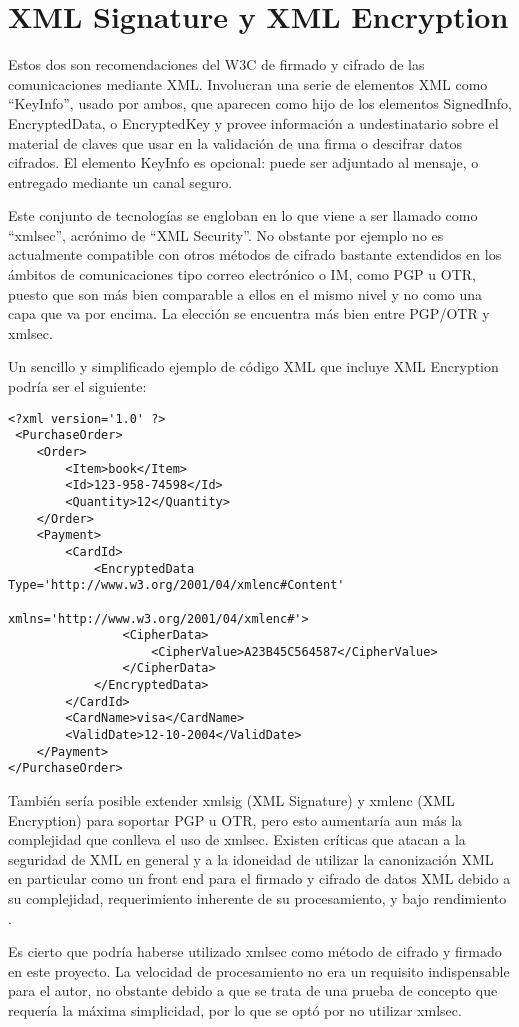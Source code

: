 \section{XML Signature y XML Encryption}\label{xmlsignature}

Estos dos son recomendaciones del W3C de firmado y cifrado de las comunicaciones mediante XML. Involucran una serie de elementos XML como ``KeyInfo'', usado por ambos, que aparecen como hijo de los elementos SignedInfo, EncryptedData, o EncryptedKey y provee información a undestinatario sobre el material de claves que usar en la validación de una firma o descifrar datos cifrados. El elemento KeyInfo es opcional: puede ser adjuntado al mensaje, o entregado mediante un canal seguro.

Este conjunto de tecnologías se engloban en lo que viene a ser llamado como ``xmlsec'', acrónimo de ``XML Security''. No obstante por ejemplo no es actualmente compatible con otros métodos de cifrado bastante extendidos en los ámbitos de comunicaciones tipo correo electrónico o IM, como PGP u OTR, puesto que son más bien comparable a ellos en el mismo nivel y no como una capa que va por encima. La elección se encuentra más bien entre PGP/OTR y xmlsec.

Un sencillo y simplificado ejemplo de código XML que incluye XML Encryption podría ser el siguiente:

\begin{verbatim}
<?xml version='1.0' ?>  
 <PurchaseOrder>
    <Order>
        <Item>book</Item>
        <Id>123-958-74598</Id>
        <Quantity>12</Quantity>
    </Order>
    <Payment>
        <CardId>
            <EncryptedData Type='http://www.w3.org/2001/04/xmlenc#Content'
                                xmlns='http://www.w3.org/2001/04/xmlenc#'>
                <CipherData>
                    <CipherValue>A23B45C564587</CipherValue>
                </CipherData>
            </EncryptedData>
        </CardId>
        <CardName>visa</CardName>
        <ValidDate>12-10-2004</ValidDate>
    </Payment>
</PurchaseOrder>
\end{verbatim}

También sería posible extender xmlsig (XML Signature) y xmlenc (XML Encryption) para soportar PGP u OTR, pero esto aumentaría aun más la complejidad que conlleva el uso de xmlsec. Existen críticas que atacan a la seguridad de XML en general y a la idoneidad de utilizar la canonización XML en particular como un front end para el firmado y cifrado de datos XML debido a su complejidad, requerimiento inherente de su procesamiento, y bajo rendimiento \cite{critica_xmlsec}.

Es cierto que podría haberse utilizado xmlsec como método de cifrado y firmado en este proyecto. La velocidad de procesamiento no era un requisito indispensable para el autor, no obstante debido a que se trata de una prueba de concepto que requería la máxima simplicidad, por lo que se optó por no utilizar xmlsec.


